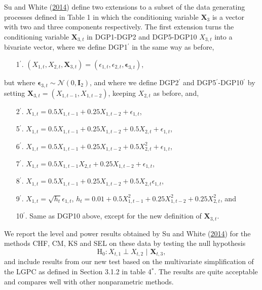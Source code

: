\documentclass[
  12pt,
  letterpaper]{article}
\providecommand{\tightlist}{%
  \setlength{\itemsep}{0pt}\setlength{\parskip}{0pt}}
\numberwithin{equation}{section}
\newcommand{\X}{\bm{X}}
\newcommand{\fepsilon}{\bm{\epsilon}}
\begin{document}
Su and White (\protect\hyperlink{ref-su2014testing}{2014}) define two extensions to a subset of the data generating processes defined in Table 1 in which the conditioning variable \(\X_3\) is a vector with two and three components respectively. The first extension turns the conditioning variable \(\X_{3,t}\) in DGP1-DGP2 and DGP5-DGP10 \(X_{3,t}\) into a bivariate vector, where we define DGP1\(^{\prime}\) in the same way as before,

\begin{itemize}
\item[1$^{\prime}$.] $(X_{1,t}, X_{2,t}, \X_{3,t}) = (\epsilon_{1,t}, \epsilon_{2,t}, \fepsilon_{3,t})$,
\end{itemize}

but where \(\fepsilon_{3,t} \sim \mathcal{N}(0, \bm{I}_2)\), and where we define DGP2\(^{\prime}\) and DGP5\(^{\prime}\)-DGP10\(^{\prime}\) by setting \(\X_{3,t} = (X_{1, t-1}, X_{1, t-2})\), keeping \(X_{2,t}\) as before, and,

\begin{itemize}
\tightlist
\item[2$^{\prime}$.] $X_{1,t} = 0.5X_{1,t-1} + 0.25X_{1, t-2} + \epsilon_{1,t}$,
\item[5$^{\prime}$.] $X_{1,t} = 0.5X_{1,t-1} + 0.25X_{1, t-2} + 0.5X_{2,t} + \epsilon_{1,t}$,
\item[6$^{\prime}$.] $X_{1,t} = 0.5X_{1,t-1} + 0.25X_{1, t-2} + 0.5X_{2,t}^2 + \epsilon_{1,t}$,
\item[7$^{\prime}$.] $X_{1,t} = 0.5X_{1,t-1}X_{2, t} + 0.25X_{1,t-2}+ \epsilon_{1,t}$,
\item[8$^{\prime}$.] $X_{1,t} = 0.5X_{1,t-1} + 0.25X_{1,t-2} + 0.5X_{2, t}\epsilon_{1,t}$,
\item[9$^{\prime}$.] $X_{1,t} = \sqrt{h_t}\epsilon_{1,t}$, $h_t = 0.01 + 0.5X_{1,t-1}^2 + 0.25X_{1,t-2}^2 + 0.25X_{2,t}^2$, and
\item[10$^{\prime}$.] Same as DGP10 above, except for the new definition of $\X_{3,t}$.
\end{itemize}

We report the level and power results obtained by Su and White (\protect\hyperlink{ref-su2014testing}{2014}) for the methods CHF, CM, KS and SEL on these data by testing the null hypothesis
\[\textrm{H}_0: X_{t,1} \perp X_{t,2} \,\, | \,\, \X_{t,3},\]
and include results from our new test based on the multivariate simplification of the LGPC as defined in Section 3.1.2 in table 4\(^*\). The results are quite acceptable and compares well with other nonparametric methods.
\end{document}
